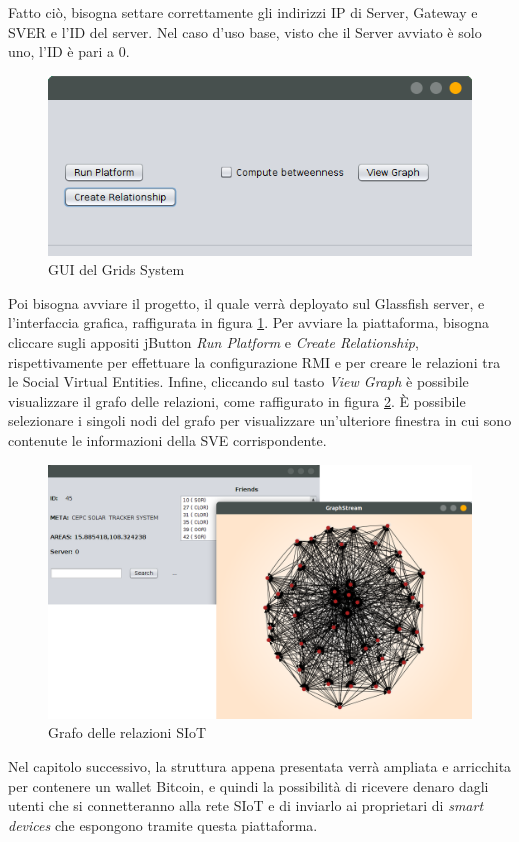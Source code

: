 Fatto ciò, bisogna settare correttamente gli indirizzi IP di Server, Gateway e SVER e l'ID del server. Nel caso d'uso base, visto che il Server avviato è solo uno, l'ID è pari a 0. 

\begin{figure}[h!t]
\centerline{\includegraphics[scale=2.5]{img/gui1}}
\caption{GUI del Grids System}
\label{f:grids:gui1}
\end{figure}

Poi bisogna avviare il progetto, il quale verrà deployato sul Glassfish server, e l'interfaccia grafica, raffigurata in figura \ref{f:grids:gui1}.
Per avviare la piattaforma, bisogna cliccare sugli appositi jButton \textit{Run Platform} e \textit{Create Relationship}, rispettivamente per effettuare la configurazione RMI e per creare le relazioni tra le Social Virtual Entities. Infine, cliccando sul tasto \textit{View Graph} è possibile visualizzare il grafo delle relazioni, come raffigurato in figura \ref{f:grids:gui2}. È possibile selezionare i singoli nodi del grafo per visualizzare un'ulteriore finestra in cui sono contenute le informazioni della SVE corrispondente.

\begin{figure}[h!t]
\centerline{\includegraphics[width=\textwidth]{img/gui2}}
\caption{Grafo delle relazioni SIoT}
\label{f:grids:gui2}
\end{figure}

Nel capitolo successivo, la struttura appena presentata verrà ampliata e arricchita per contenere un wallet Bitcoin, e quindi la possibilità di ricevere denaro dagli utenti che si connetteranno alla rete SIoT e di inviarlo ai proprietari di \textit{smart devices} che espongono tramite questa piattaforma.